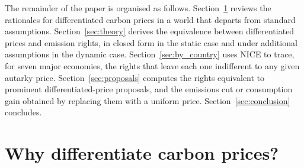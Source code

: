 \documentclass[12pt,english]{article}
\theoremstyle{remark}
\begin{document}

The remainder of the paper is organised as follows. Section~\ref{sec:arguments} reviews the rationales for differentiated carbon prices in a world that departs from standard assumptions. Section~\ref{sec:theory} derives the equivalence between differentiated prices and emission rights, in closed form in the static case and under additional assumptions in the dynamic case. Section~\ref{sec:by_country} uses NICE to trace, for seven major economies, the rights that leave each one indifferent to any given autarky price. Section~\ref{sec:proposals} computes the rights equivalent to prominent differentiated-price proposals, and the emissions cut or consumption gain obtained by replacing them with a uniform price. Section~\ref{sec:conclusion} concludes.

\section{Why differentiate carbon prices?}
\label{sec:arguments}
\end{document}
